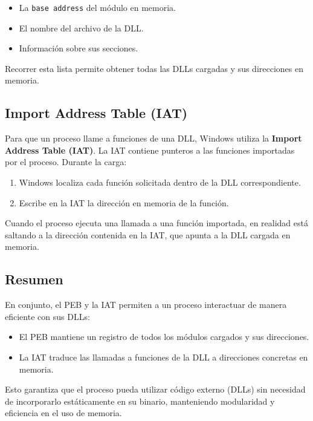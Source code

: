 \begin{itemize}
    \item La \texttt{base address} del módulo en memoria.
    \item El nombre del archivo de la DLL.
    \item Información sobre sus secciones.
\end{itemize}

Recorrer esta lista permite obtener todas las DLLs cargadas y sus direcciones en 
memoria.

\subsection{Import Address Table (IAT)}
Para que un proceso llame a funciones de una DLL, Windows utiliza la 
\textbf{Import Address Table (IAT)}. La IAT contiene punteros a las funciones 
importadas por el proceso. Durante la carga:

\begin{enumerate}
    \item Windows localiza cada función solicitada dentro de la DLL 
    correspondiente.
    \item Escribe en la IAT la dirección en memoria de la función.
\end{enumerate}

Cuando el proceso ejecuta una llamada a una función importada, en realidad está 
saltando a la dirección contenida en la IAT, que apunta a la DLL cargada en 
memoria.

\subsection{Resumen}
En conjunto, el PEB y la IAT permiten a un proceso interactuar de manera 
eficiente con sus DLLs:

\begin{itemize}
    \item El PEB mantiene un registro de todos los módulos cargados y sus 
    direcciones.
    \item La IAT traduce las llamadas a funciones de la DLL a direcciones 
    concretas en memoria.
\end{itemize}

Esto garantiza que el proceso pueda utilizar código externo (DLLs) sin necesidad 
de incorporarlo estáticamente en su binario, manteniendo modularidad y eficiencia 
en el uso de memoria.

